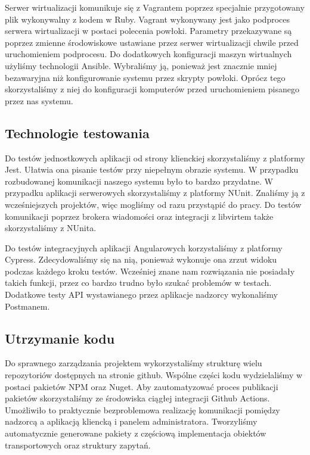 \documentclass[../opis-rozwiazania.tex]{subfiles}
\begin{document}
Serwer wirtualizacji komunikuje się z Vagrantem poprzez specjalnie przygotowany plik wykonywalny z kodem w Ruby.
Vagrant wykonywany jest jako podproces serwera wirtualizacji w postaci polecenia powłoki.
Parametry przekazywane są poprzez zmienne środowiskowe ustawiane przez serwer wirtualizacji chwile przed uruchomieniem podprocesu.
Do dodatkowych konfiguracji maszyn wirtualnych użyliśmy technologii Ansible.
Wybraliśmy ją, ponieważ jest znacznie mniej bezawaryjna niż konfigurowanie systemu przez skrypty powłoki.
Oprócz tego skorzystaliśmy z niej do konfiguracji komputerów przed uruchomieniem pisanego przez nas systemu.

\subsection{Technologie testowania}
Do testów jednostkowych aplikacji od strony klienckiej skorzystaliśmy z platformy Jest.
Ułatwia ona pisanie testów przy niepełnym obrazie systemu. W przypadku rozbudowanej komunikacji naszego systemu było to bardzo przydatne.
W przypadku aplikacji serwerowych skorzystaliśmy z platformy NUnit.
Znaliśmy ją z wcześniejszych projektów, więc mogliśmy od razu przystąpić do pracy.
Do testów komunikacji poprzez brokera wiadomości oraz integracji z libvirtem także skorzystaliśmy z NUnita.

Do testów integracyjnych aplikacji Angularowych korzystaliśmy z platformy Cypress.
Zdecydowaliśmy się na nią, ponieważ wykonuje ona zrzut widoku podczas każdego kroku testów.
Wcześniej znane nam rozwiązania nie posiadały takich funkcji, przez co bardzo trudno było szukać problemów w testach.
Dodatkowe testy API wystawianego przez aplikacje nadzorcy wykonaliśmy Postmanem.

\subsection{Utrzymanie kodu}
Do sprawnego zarządzania projektem wykorzystaliśmy strukturę wielu repozytoriów dostępnych na stronie github.
Wspólne części kodu wydzielaliśmy w postaci pakietów NPM oraz Nuget.
Aby zautomatyzować proces publikacji pakietów skorzystaliśmy ze środowiska ciągłej integracji Github Actions.
Umożliwiło to praktycznie bezproblemowa realizację komunikacji pomiędzy nadzorcą a aplikacją kliencką i panelem administratora.
Tworzyliśmy automatycznie generowane pakiety z częściową implementacja obiektów transportowych oraz struktury zapytań.
\end{document}
